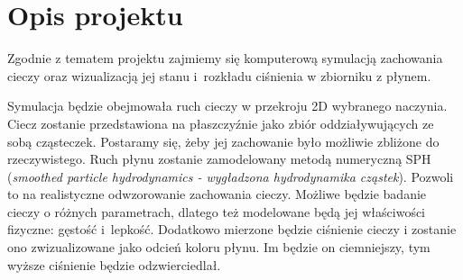 \documentclass[a4paper]{article}
\begin{document}

\section{Opis projektu}
Zgodnie z tematem projektu zajmiemy się komputerową symulacją zachowania cieczy oraz wizualizacją jej stanu i~rozkładu ciśnienia w zbiorniku z płynem. 

Symulacja będzie obejmowała ruch cieczy w przekroju 2D wybranego naczynia. Ciecz zostanie przedstawiona na płaszczyźnie jako zbiór oddziaływujących ze sobą cząsteczek. 
Postaramy się, żeby jej zachowanie było możliwie zbliżone do rzeczywistego.
Ruch płynu zostanie zamodelowany metodą numeryczną SPH (\textit{smoothed particle hydrodynamics - wygładzona hydrodynamika cząstek}).
Pozwoli to na realistyczne odwzorowanie zachowania cieczy.
Możliwe będzie badanie cieczy o różnych parametrach, dlatego też modelowane będą jej właściwości fizyczne: gęstość i~lepkość. 
Dodatkowo mierzone będzie ciśnienie cieczy i zostanie ono zwizualizowane jako odcień koloru płynu.
Im będzie on ciemniejszy, tym wyższe ciśnienie będzie odzwierciedlał.
\end{document}

